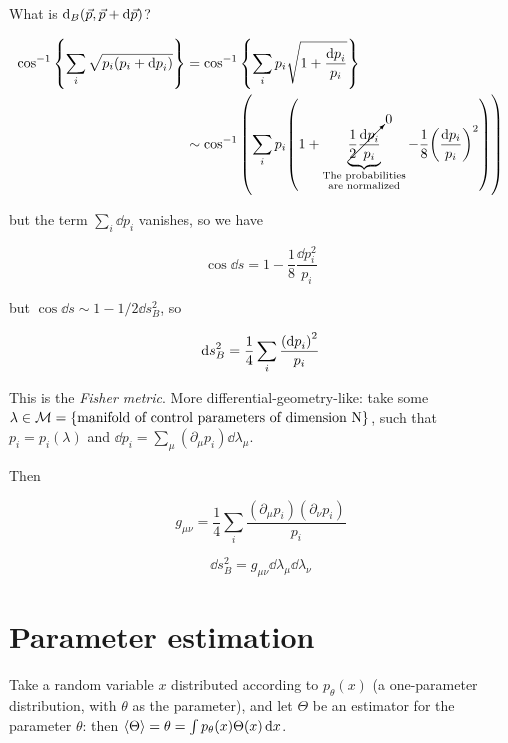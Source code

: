 \documentclass[main_zanardi.tex]{subfiles}
\begin{document}
What is \( \dd _{B} \qty(\vec{p} , \vec{p} + \dd{\vec{p}}) \)?

\begin{align}
  \cos ^{-1} \qty{\sum_i \sqrt{p_i(p_i + \dd{p}_i)}}
  &= \cos ^{-1} \qty{\sum_i p_i \sqrt{1 + \frac{\dd{p}_i }{p_i}}}  \\
  &\sim \cos ^{-1} \qty(\sum_i p_i \qty(1 + \underbrace{\cancelto{0}{\frac{1}{2} \frac{\dd{p}_i}{p_i}}}_{\substack{\text{The probabilities}\\ \text{are normalized}}}     - \frac{1}{8} \qty(\frac{\dd{p_i}}{p_i})^{2} ))
\end{align}

but the term \( \sum_i \dd{p}_i \) vanishes, so we have

\begin{equation}
  \cos \dd{s} = 1 - \frac{1}{8}\frac{\dd{p}_i ^{2} }{p_i}
\end{equation}

but \( \cos \dd{s} \sim 1 - 1/2 \dd{s}^{2} _{B}  \), so

\begin{equation} \label{eq:fisher-metric}
  \dd{s}^{2}_{B}  = \frac{1}{4} \sum_i  \frac{\qty(\dd{p}_i)^{2} }{p_i}
\end{equation}

This is the \emph{Fisher metric}. More differential-geometry-like: take some \( \lambda \in \mathcal{M} = \qty{\text{manifold of control parameters of dimension N}} \), such that \( p_i = p_i(\lambda) \) and  \( \dd{p}_i = \sum_\mu (\partial_\mu p_i) \dd{\lambda_\mu} \).

Then

\begin{equation}
  g _{\mu \nu} = \frac{1}{4} \sum_i \frac{(\partial_\mu p_i)(\partial_\nu p_i)}{p_i}
\end{equation}

\begin{equation}
  \dd{s}_B ^2 = g _{\mu \nu} \dd{\lambda}_\mu \dd{\lambda}_\nu
\end{equation}

\section{Parameter estimation}

Take a random variable \( x \) distributed according to \(p_\theta (x)\) (a one-parameter distribution, with \(\theta\) as the parameter), and let \(\Theta\) be an estimator for the parameter \(\theta\): then \( \expval{\Theta} = \theta = \int  p_\theta(x) \Theta(x) \dd{x}  \).
\end{document}
